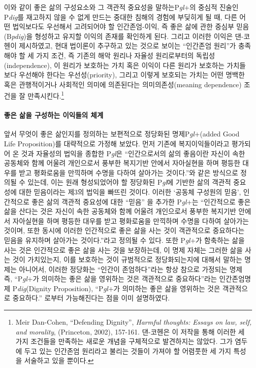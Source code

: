 이와 같이 좋은 삶의 구성요소와 그 객관적 중요성을 말하는P\emph{gl}+의 중심적 진술인 P\emph{dig}를 재고하지 않을 수 없게 만드는 중대한 침해의 경험에 부딪히게 될 때, 다른 어떤 법익보다도 우선해서 고려되어야 할 인간존엄-이익, 즉 좋은 삶에 관한 중심부 믿음(B\emph{pdig})을 형성하고 유지할 이익의 존재를 확인하게 된다. 그리고 이러한 이익은 댄-코헨이 제시하였고, 현대 법이론이 추구하고 있는 것으로 보이는 ``인간존엄 원리''가 충족해야 할 세 가지 조건, 즉 기존의 해악 원리나 자율성 원리로부터의 독립성(independence), 이 원리가 보호하는 가치 혹은 이익이 다른 원리가 보호하는 가치들보다 우선해야 한다는 우선성(priority), 그리고 이렇게 보호되는 가치는 어떤 명백한 혹은 관행적이거나 사회적인 의미에 의존된다는 의미의존성(meaning dependence) 조건을 잘 만족시킨다.\footnote{Meir Dan-Cohen, ``Defending Dignity'', \emph{Harmful thoughts: Essays on law, self, and morality}, (Princeton, 2002), 157-161. 댄-코헨은 이 저작을 통해 이러한 세 가지 조건들을 만족하는 새로운 개념을 구체적으로 발견하지는 않았다. 그가 염두에 두고 있는 인간존엄 원리라고 불리는 것들이 가져야 할 어렴풋한 세 가지 특성을 서술하고 있을 뿐이다.}

\paragraph{좋은 삶을 구성하는 이익들의 체계}

앞서 무엇이 좋은 삶인지를 정의하는 보편적으로 정당화된 명제P\emph{gl}+(added Good Life Proposition)를 대략적으로 가정해 보았다. 먼저 기존에 복지이익들이라고 평가되어 온 것과 자율성의 법익을 종합한 P\emph{gl}은 ``인간으로서의 삶의 좋음이란 자신이 속한 공동체와 함께 어울려 개인으로서 풍부한 복지기반 안에서 자아실현을 하며 평등한 대우를 받고 평화로움을 만끽하며 수명을 다하여 살아가는 것이다.''와 같은 방식으로 정의될 수 있는데, 이는 원래 형성되었어야 할 정당화된 P\emph{gl}에 기반한 삶의 객관적 중요성에 대한 믿음이라는 제3의 법익을 빠뜨린 것이다. 이러한 `공동체 구성원의 믿음', 인간적으로 좋은 삶의 객관적 중요성에 대한 ``믿음'' 을 추가한 P\emph{gl}+는 ``인간적으로 좋은 삶을 산다는 것은 자신이 속한 공동체와 함께 어울려 개인으로서 풍부한 복지기반 안에서 자아실현을 하며 평등한 대우를 받고 평화로움을 만끽하며 수명을 다하여 살아가는 것이며, 또한 동시에 이러한 인간적으로 좋은 삶을 사는 것이 객관적으로 중요하다는 믿음을 유지하며 살아가는 것이다.''라고 정의될 수 있다. 또한 P\emph{gl}+가 함축하는 삶을 사는 것은 인간적으로 좋은 삶을 사는 것을 보장하는데, 이 명제 자체는 그러한 삶을 사는 것이 가치있는지, 이를 보호하는 것이 규범적으로 정당화되는지에 대해서 말하는 명제는 아니어서, 이러한 정당화는 ``인간이 존엄하다''라는 항상 참으로 가정되는 명제 즉, ``P\emph{gl}+가 의미하는 좋은 삶을 영위하는 것은 객관적으로 중요하다''라는 인간존엄명제 P\emph{dig}(Dignity Proposition), ``P\emph{gl}+가 의미하는 좋은 삶을 영위하는 것은 객관적으로 중요하다.'' 로부터 가능해진다는 점을 이미 설명하였다.

